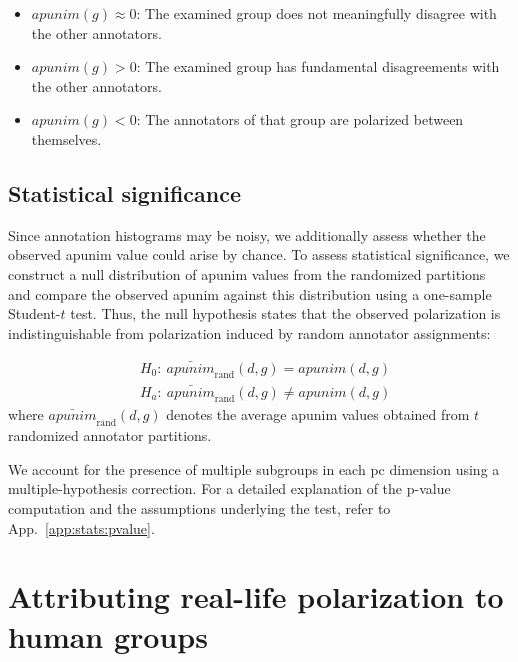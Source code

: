 \documentclass{article} %
\theoremstyle{definition}
\theoremstyle{plain}
\begin{document}
\begin{itemize}
	\item$apunim(g) \approx 0$: The examined group does not meaningfully disagree with the other annotators.
	
	\item $apunim(g) > 0$: The examined group has fundamental disagreements with the other annotators. 
	
	\item $apunim(g) < 0$: The annotators of that group are polarized between themselves.
\end{itemize}


\subsection{Statistical significance}
\label{sec:apunim:statistical}

Since annotation histograms may be noisy, we additionally assess whether the observed apunim value could arise by chance. To assess statistical significance, we construct a null distribution of apunim values from the randomized partitions and compare the observed apunim against this distribution using a one-sample Student-\(t\) test. Thus, the null hypothesis states that the observed polarization is indistinguishable from polarization induced by random annotator assignments:

\begin{equation}
	\label{eq:pvalue}
	\begin{split}
		&H_0:\ 
		\bar{\textit{apunim}}_{\mathrm{rand}}(d,g)
		=
		\textit{apunim}(d,g) \\
		&H_a:\ 
		\bar{\textit{apunim}}_{\mathrm{rand}}(d,g)
		\neq
		\textit{apunim}(d,g)
	\end{split}
\end{equation}
\noindent where \(\bar{\textit{apunim}}_{\mathrm{rand}}(d,g)\) denotes the average apunim values obtained from $t$ randomized annotator partitions.

 We account for the presence of multiple subgroups in each \ac{pc} dimension using a multiple-hypothesis correction. For a detailed explanation of the p-value computation and the assumptions underlying the test, refer to App.~\ref{app:stats:pvalue}.


\section{Attributing real-life polarization to human groups}
\label{sec:results}
\end{document}
